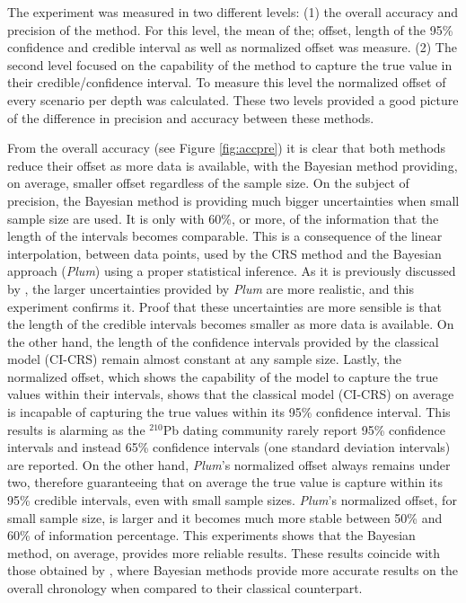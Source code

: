 \documentclass [10pt] {article}
\begin{document}
The experiment was measured in two different levels: (1) the overall accuracy and precision of the method.
For this level, the mean of the; offset, length of the 95\% confidence and credible interval as well as normalized offset was measure.
(2) The second level focused on the capability of the method to capture the true value in their credible/confidence interval.
To measure this level the normalized offset of every scenario per depth was calculated. 
These two levels provided a good picture of the difference in precision and accuracy between these methods.

From the overall accuracy (see Figure \ref{fig:accpre}) it is clear that both methods reduce their offset as more data is available, with the Bayesian method providing, on average, smaller offset regardless of the sample size. 
On the subject of precision, the Bayesian method is providing much bigger uncertainties when small sample size are used. 
It is only with 60\%, or more, of the information that the length of the intervals becomes comparable. 
This is a consequence of the linear interpolation, between data points, used by the CRS method and the Bayesian approach (\textit{Plum}) using a proper statistical inference.  
As it is previously discussed by \citet{Aquino2020}, the larger uncertainties provided by \textit{Plum} are more realistic, and this experiment confirms it.
Proof that these uncertainties are more sensible is that the length of the credible intervals becomes smaller as more data is available. 
On the other hand, the length of the confidence intervals provided by the classical model (CI-CRS) remain almost constant at any sample size.
Lastly, the normalized offset, which shows the capability of the model to capture the true values within their intervals, shows that the classical model (CI-CRS) on average is incapable of capturing the true values within its 95\% confidence interval. 
This results is alarming as the $^{210}$Pb dating community rarely report 95\% confidence intervals and instead 65\% confidence intervals (one standard deviation intervals) are reported.
On the other hand, \textit{Plum}'s normalized offset always remains under two, therefore guaranteeing that on average the true value is capture within its 95\% credible intervals, even with small sample sizes.
\textit{Plum}'s normalized offset, for small sample size, is larger and it becomes much more stable between 50\% and 60\% of information percentage.
This experiments shows that the Bayesian method, on average, provides more reliable results.
These results coincide with those obtained by \citet{Blaauw2018}, where Bayesian methods provide more accurate results on the overall chronology when compared to their classical counterpart. 
\end{document}
